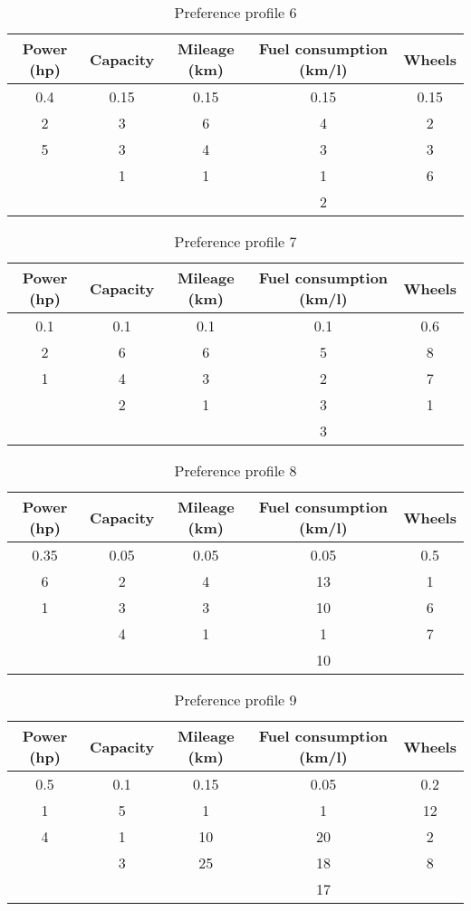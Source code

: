 \documentclass[11pt,a4paper]{report}
\begin{document}
\begin{table}[H]
\centering
\caption{Preference profile 6}
\label{tab:prefprof6}
\begin{tabular}{|c|c|c|c|c|}
\hline
Power (hp) & Capacity & Mileage (km) & Fuel consumption (km/l) & Wheels \\
\hline
0.4 & 0.15 & 0.15 & 0.15 & 0.15 \\
\hline
2 & 3 & 6 & 4 & 2 \\
5 & 3 & 4 & 3 & 3 \\
  & 1 & 1 & 1 & 6 \\
  &   &   & 2 &   \\ 
\hline
\end{tabular}
\end{table}

\begin{table}[H]
\centering
\caption{Preference profile 7}
\label{tab:prefprof7}
\begin{tabular}{|c|c|c|c|c|}
\hline
Power (hp) & Capacity & Mileage (km) & Fuel consumption (km/l) & Wheels \\
\hline
0.1 & 0.1 & 0.1 & 0.1 & 0.6 \\
\hline
2 & 6 & 6 & 5 & 8 \\
1 & 4 & 3 & 2 & 7 \\
  & 2 & 1 & 3 & 1 \\
  &   &   & 3 &   \\ 
\hline
\end{tabular}
\end{table}

\begin{table}[H]
\centering
\caption{Preference profile 8}
\label{tab:prefprof8}
\begin{tabular}{|c|c|c|c|c|}
\hline
Power (hp) & Capacity & Mileage (km) & Fuel consumption (km/l) & Wheels \\
\hline
0.35 & 0.05 & 0.05 & 0.05 & 0.5 \\
\hline
6 & 2 & 4 & 13 & 1 \\
1 & 3 & 3 & 10 & 6 \\
  & 4 & 1 & 1  & 7 \\
  &   &   & 10 &   \\ 
\hline
\end{tabular}
\end{table}

\begin{table}[H]
\centering
\caption{Preference profile 9}
\label{tab:prefprof9}
\begin{tabular}{|c|c|c|c|c|}
\hline
Power (hp) & Capacity & Mileage (km) & Fuel consumption (km/l) & Wheels \\
\hline
0.5 & 0.1 & 0.15 & 0.05 & 0.2 \\
\hline
1 & 5 & 1  & 1  & 12\\
4 & 1 & 10 & 20 & 2 \\
  & 3 & 25 & 18 & 8 \\
  &   &    & 17 &   \\ 
\hline
\end{tabular}
\end{table}
\end{document}
